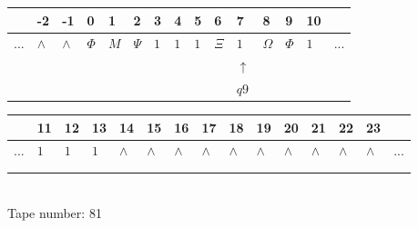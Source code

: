 \documentclass[11pt]{article}
\begin{document}
\begin{table}[H]
\centering
\begin{tabular}{lllllllllllllll}
 & -2 & -1 & 0 & 1 & 2 & 3 & 4 & 5 & 6 & 7 & 8 & 9 & 10 & \\
\hline
$...$ & \multicolumn{1}{|l|}{$\wedge$} & \multicolumn{1}{|l|}{$\wedge$} & \multicolumn{1}{|l|}{$\Phi$} & \multicolumn{1}{|l|}{$M$} & \multicolumn{1}{|l|}{$\Psi$} & \multicolumn{1}{|l|}{$1$} & \multicolumn{1}{|l|}{$1$} & \multicolumn{1}{|l|}{$1$} & \multicolumn{1}{|l|}{$\Xi$} & \multicolumn{1}{|l|}{$1$} & \multicolumn{1}{|l|}{$\Omega$} & \multicolumn{1}{|l|}{$\Phi$} & \multicolumn{1}{|l|}{$1$} & $...$\\
\hline
&  &  &  &  &  &  &  &  &  & $\uparrow$ &  &  &  &  \\
&  &  &  &  &  &  &  &  &  & $ q9 $ &  &  &  &  \\
\end{tabular}
\begin{tabular}{lllllllllllllll}
 & 11 & 12 & 13 & 14 & 15 & 16 & 17 & 18 & 19 & 20 & 21 & 22 & 23 & \\
\hline
$...$ & \multicolumn{1}{|l|}{$1$} & \multicolumn{1}{|l|}{$1$} & \multicolumn{1}{|l|}{$1$} & \multicolumn{1}{|l|}{$\wedge$} & \multicolumn{1}{|l|}{$\wedge$} & \multicolumn{1}{|l|}{$\wedge$} & \multicolumn{1}{|l|}{$\wedge$} & \multicolumn{1}{|l|}{$\wedge$} & \multicolumn{1}{|l|}{$\wedge$} & \multicolumn{1}{|l|}{$\wedge$} & \multicolumn{1}{|l|}{$\wedge$} & \multicolumn{1}{|l|}{$\wedge$} & \multicolumn{1}{|l|}{$\wedge$} & $...$\\
\hline
&  &  &  &  &  &  &  &  &  &  &  &  &  &  \\
&  &  &  &  &  &  &  &  &  &  &  &  &  &  \\
\end{tabular}
\\
Tape number: 81
\noindent\makebox[\linewidth]{\hdashrule{\textwidth}{1pt}{1pt}}\end{table}
\end{document}
